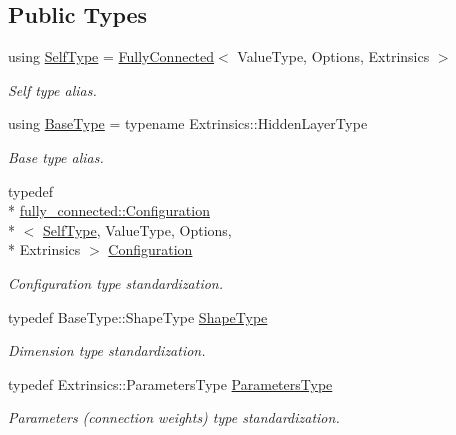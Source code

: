 \subsection*{Public Types}
\begin{DoxyCompactItemize}
\item 
using \hyperlink{classffnn_1_1layer_1_1_fully_connected_a886c7ef9b12d8835f0acb231f446e8cf}{Self\-Type} = \hyperlink{classffnn_1_1layer_1_1_fully_connected}{Fully\-Connected}$<$ Value\-Type, Options, Extrinsics $>$
\begin{DoxyCompactList}\small\item\em Self type alias. \end{DoxyCompactList}\item 
using \hyperlink{classffnn_1_1layer_1_1_fully_connected_afd4e92710e0f74a32ea0ca1a44925b48}{Base\-Type} = typename Extrinsics\-::\-Hidden\-Layer\-Type
\begin{DoxyCompactList}\small\item\em Base type alias. \end{DoxyCompactList}\item 
typedef \\*
\hyperlink{classffnn_1_1layer_1_1fully__connected_1_1_configuration}{fully\-\_\-connected\-::\-Configuration}\\*
$<$ \hyperlink{classffnn_1_1layer_1_1_fully_connected_a886c7ef9b12d8835f0acb231f446e8cf}{Self\-Type}, Value\-Type, Options, \\*
Extrinsics $>$ \hyperlink{classffnn_1_1layer_1_1_fully_connected_a0f17b9785828b21e00a8fe84fd173406}{Configuration}
\begin{DoxyCompactList}\small\item\em Configuration type standardization. \end{DoxyCompactList}\item 
typedef Base\-Type\-::\-Shape\-Type \hyperlink{classffnn_1_1layer_1_1_fully_connected_a9599c763b107d8b07bba62a74c88e907}{Shape\-Type}
\begin{DoxyCompactList}\small\item\em Dimension type standardization. \end{DoxyCompactList}\item 
typedef Extrinsics\-::\-Parameters\-Type \hyperlink{classffnn_1_1layer_1_1_fully_connected_aab9cb25e10620b406a13414ac81747fa}{Parameters\-Type}
\begin{DoxyCompactList}\small\item\em Parameters (connection weights) type standardization. \end{DoxyCompactList}\end{DoxyCompactItemize}
